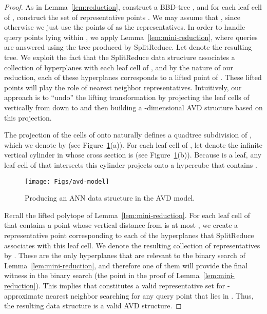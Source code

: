 \documentclass[11pt]{article}   \usepackage[letterpaper,hmargin=2.1cm,vmargin=3cm]{geometry}
\newcommand{\alg}{\textrm{SplitReduce}}
\begin{document}
\begin{proof}
As in Lemma~\ref{lem:reduction}, construct a BBD-tree , and for each leaf cell  of , construct the set of representative points . We may assume that , since otherwise we just use the points of  as the representatives. In order to handle query points lying within , we apply Lemma~\ref{lem:mini-reduction}, where queries are answered using the tree produced by {\alg}. Let  denote the resulting tree. We exploit the fact that the {\alg} data structure associates a collection of hyperplanes with each leaf cell of , and by the nature of our reduction, each of these hyperplanes corresponds to a lifted point of . These lifted points will play the role of nearest neighbor representatives. Intuitively, our approach is to ``undo'' the lifting transformation by projecting the leaf cells of  vertically from  down to  and then building a -dimensional AVD structure based on this projection. 

The projection of the cells of  onto  naturally defines a quadtree subdivision of , which we denote by  (see Figure~\ref{fig:avd-model}(a)). For each leaf cell  of , let  denote the infinite vertical cylinder in  whose cross section is  (see Figure~\ref{fig:avd-model}(b)). Because  is a leaf, any leaf cell of  that intersects this cylinder projects onto a hypercube that contains . 

\begin{figure}[htbp]
  \centerline{\texttt{[image: Figs/avd-model]}}
  \caption{Producing an ANN data structure in the AVD model.}
  \label{fig:avd-model}
\end{figure}


Recall the lifted polytope  of Lemma~\ref{lem:mini-reduction}. For each leaf cell of  that contains a point whose vertical distance from  is at most , we create a representative point corresponding to each of the hyperplanes that {\alg} associates with this leaf cell. We denote the resulting collection of representatives by . These are the only hyperplanes that are relevant to the binary search of Lemma~\ref{lem:mini-reduction}, and therefore one of them will provide the final witness in the binary search (the point  in the proof of Lemma~\ref{lem:mini-reduction}). This implies that  constitutes a valid representative set for -approximate nearest neighbor searching for any query point that lies in . Thus, the resulting data structure is a valid AVD structure. 


\end{proof}
\end{document}
